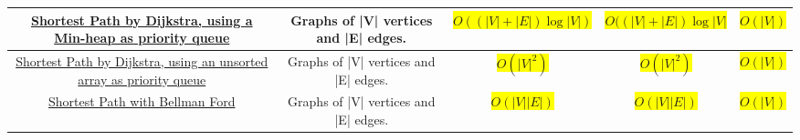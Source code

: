 \documentclass[11pt]{article}
\begin{document}
\begin{adjustbox}{max width=\textwidth,max totalheight=\textheight,keepaspectratio}
\begin{tabular}{| c | c | c | c | c |}
\hline
\parbox{6cm}{\centering \href{http://en.wikipedia.org/wiki/Dijkstra\%27s_algorithm}{Shortest Path by Dijkstra, using a Min-heap as priority queue}} & Graphs of |V| vertices and |E| edges. & \colorbox{yellow}{\begin{math}O((|V| + |E|) \log |V|)\end{math}} & \colorbox{yellow}{\begin{math}O((|V| + |E|) \log |V|\end{math}} & \colorbox{yellow}{\begin{math}O(|V|)\end{math}} \\
\hline
\parbox{6cm}{\centering \href{http://en.wikipedia.org/wiki/Dijkstra\%27s_algorithm}{Shortest Path by Dijkstra, using an unsorted array as priority queue}} & Graphs of |V| vertices and |E| edges. & \colorbox{yellow}{\begin{math}O(|V|^2)\end{math}} & \colorbox{yellow}{\begin{math}O(|V|^2)\end{math}} & \colorbox{yellow}{\begin{math}O(|V|)\end{math}} \\
\hline
\href{http://en.wikipedia.org/wiki/Bellman\%E2\%80\%93Ford_algorithm}{Shortest Path with Bellman Ford} & Graphs of |V| vertices and |E| edges. & \colorbox{yellow}{\begin{math}O(|V||E|)\end{math}} & \colorbox{yellow}{\begin{math}O(|V||E|)\end{math}} & \colorbox{yellow}{\begin{math}O(|V|)\end{math}} \\
\hline
\end{tabular}
\end{adjustbox}
\end{document}
